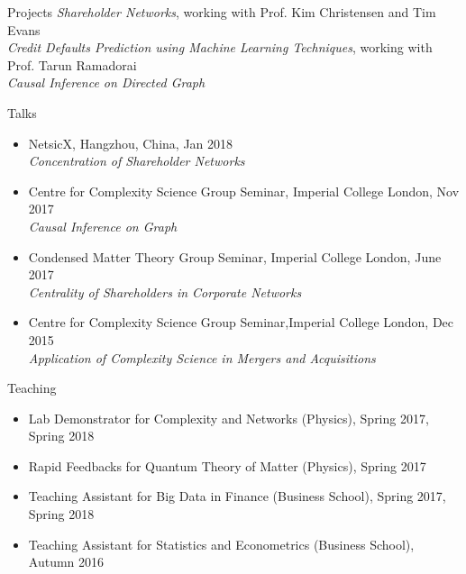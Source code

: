 \documentclass{resume} %
\begin{document}
\begin{rSection}{Projects}
\textit{Shareholder Networks}, working with Prof. Kim Christensen and Tim Evans\\
\textit{Credit Defaults Prediction using Machine Learning Techniques}, working with Prof. Tarun Ramadorai\\
\textit{Causal Inference on Directed Graph}
\end{rSection}
\begin{rSection}{Talks}
\begin{itemize}
\item NetsicX, Hangzhou, China, Jan 2018\\
\textit{Concentration of Shareholder Networks}
\item
Centre for Complexity Science Group Seminar, Imperial College London, Nov 2017\\
\textit{Causal Inference on Graph}

\item{
{Condensed Matter Theory Group Seminar}, Imperial College London, {June 2017}\\
{\em  Centrality of Shareholders in Corporate Networks }
}
\item{
{Centre for Complexity Science Group Seminar},Imperial College London, {Dec 2015}\\
{\em Application of Complexity Science in Mergers and Acquisitions}} 
\end{itemize}

\end{rSection}



\begin{rSection}{Teaching}
\begin{itemize}
\item Lab Demonstrator for Complexity and Networks (Physics), Spring 2017, Spring 2018
\item Rapid Feedbacks for Quantum Theory of Matter (Physics), Spring 2017
\item Teaching Assistant for Big Data in Finance (Business School), Spring 2017, Spring 2018
\item Teaching Assistant for Statistics and Econometrics (Business School), Autumn 2016
\end{itemize}
\end{rSection}
\end{document}
